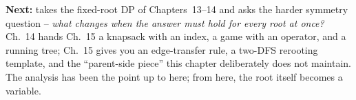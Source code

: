 \begin{lastword}
\medskip
\textbf{Next:}  takes the fixed-root DP of Chapters~13--14 and
asks the harder symmetry question -- \emph{what changes when the answer must
hold for every root at once?} Ch.~14 hands Ch.~15 a knapsack with an index,
a game with an operator, and a running tree; Ch.~15 gives you an edge-transfer
rule, a two-DFS rerooting template, and the ``parent-side piece'' this chapter
deliberately does not maintain. The analysis has been the point up to here;
from here, the root itself becomes a variable.
\end{lastword}
